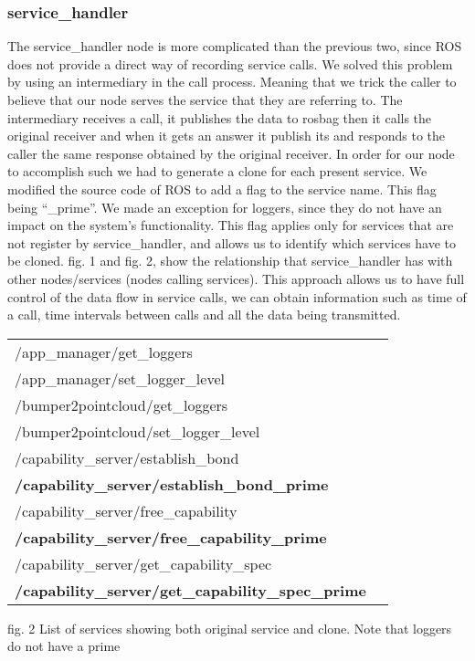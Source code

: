 \documentclass[10pt, conference]{IEEEtran}
\begin{document}
\subsubsection{service\_handler}
\normalsize
The service\_handler node is more complicated than the previous two, since ROS does not provide a direct way of recording service calls. We solved this problem by using an intermediary in the call process. Meaning that we trick the caller to believe that our node serves the service that they are referring to. The intermediary receives a call, it publishes the data to rosbag then it calls the original receiver and when it gets an answer it publish its and responds to the caller the same response obtained by the original receiver. In order for our node to accomplish such we had to generate a clone for each present service. We modified the source code of ROS to add a flag to the service name. This flag being “\_prime”. We made an exception for loggers, since they do not have an impact on the system's functionality. This flag applies only for services that are not register by service\_handler, and allows us to identify which services have to be cloned. fig. 1 and fig. 2, show the relationship that service\_handler has with other nodes/services (nodes calling services). This approach allows us to have full control of the data flow in service calls, we can obtain information such as time of a call, time intervals between calls and all the data being transmitted.

\begin{table}[h!]
 \begin{tabular}{l c} 
/app\_manager/get\_loggers \\
/app\_manager/set\_logger\_level \\
/bumper2pointcloud/get\_loggers \\
/bumper2pointcloud/set\_logger\_level \\
/capability\_server/establish\_bond \\
\textbf {/capability\_server/establish\_bond\_prime} \\
/capability\_server/free\_capability \\
\textbf {/capability\_server/free\_capability\_prime} \\
/capability\_server/get\_capability\_spec \\
\textbf {/capability\_server/get\_capability\_spec\_prime} \\ [1ex] 
 \end{tabular}
 \begin{tablenotes}
	\scriptsize
      \item fig. 2 List of services showing both original service and clone. Note that loggers do not have a prime
    \end{tablenotes}
\end{table}
\end{document}
